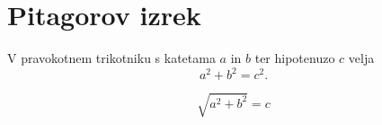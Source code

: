\documentclass{article}
\begin{document}
\section*{Pitagorov izrek}
V pravokotnem trikotniku s katetama \(a\) in \(b\) ter hipotenuzo \(c\) velja
\[ a^2 + b^2 = c^2. \]
\begin{center}
     \[ \sqrt{a^2+b^2} = c \]
\end{center}
\end{document}
